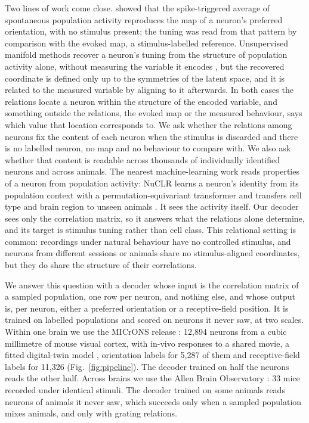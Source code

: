 \documentclass[11pt]{article}
\begin{document}
Two lines of work come close. \citet{tsodyks1999} showed that the spike-triggered average of spontaneous population activity reproduces the map of a neuron's preferred orientation, with no stimulus present; the tuning was read from that pattern by comparison with the evoked map, a stimulus-labelled reference. Unsupervised manifold methods recover a neuron's tuning from the structure of population activity alone, without measuring the variable it encodes \citep{rubin2019}, but the recovered coordinate is defined only up to the symmetries of the latent space, and it is related to the measured variable by aligning to it afterwards. In both cases the relations locate a neuron within the structure of the encoded variable, and something outside the relations, the evoked map or the measured behaviour, says which value that location corresponds to. We ask whether the relations among neurons fix the content of each neuron when the stimulus is discarded and there is no labelled neuron, no map and no behaviour to compare with. We also ask whether that content is readable across thousands of individually identified neurons and across animals. The nearest machine-learning work reads properties of a neuron from population activity: NuCLR learns a neuron's identity from its population context with a permutation-equivariant transformer and transfers cell type and brain region to unseen animals \citep{arora2025}. It sees the activity itself. Our decoder sees only the correlation matrix, so it answers what the relations alone determine, and its target is stimulus tuning rather than cell class. This relational setting is common: recordings under natural behaviour have no controlled stimulus, and neurons from different sessions or animals share no stimulus-aligned coordinates, but they do share the structure of their correlations.

We answer this question with a decoder whose input is the correlation matrix of a sampled population, one row per neuron, and nothing else, and whose output is, per neuron, either a preferred orientation or a receptive-field position. It is trained on labelled populations and scored on neurons it never saw, at two scales. Within one brain we use the MICrONS release \citep{ding2025,microns2025}: 12,894 neurons from a cubic millimetre of mouse visual cortex, with in-vivo responses to a shared movie, a fitted digital-twin model \citep{wang2025}, orientation labels for 5,287 of them and receptive-field labels for 11,326 (Fig.~\ref{fig:pipeline}). The decoder trained on half the neurons reads the other half. Across brains we use the Allen Brain Observatory \citep{devries2020}: 33 mice recorded under identical stimuli. The decoder trained on some animals reads neurons of animals it never saw, which succeeds only when a sampled population mixes animals, and only with grating relations.
\end{document}
